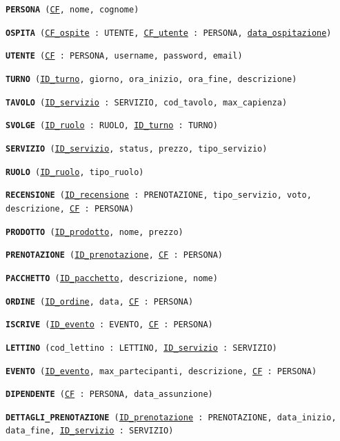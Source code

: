 \documentclass[a4paper,12pt]{report}
\begin{document}
\begin{description}
	\item\texttt{\textbf{PERSONA} (\underline{CF}, nome, cognome)}
	\item\texttt{\textbf{OSPITA} (\underline{CF\_ospite} : UTENTE, \underline{CF\_utente} : PERSONA, \underline{data\_ospitazione})}
	\item\texttt{\textbf{UTENTE} (\underline{CF} : PERSONA, username, password, email)}
	\item\texttt{\textbf{TURNO} (\underline{ID\_turno}, giorno, ora\_inizio, ora\_fine, descrizione)}
	\item\texttt{\textbf{TAVOLO} (\underline{ID\_servizio} : SERVIZIO, cod\_tavolo, max\_capienza)}
	\item\texttt{\textbf{SVOLGE} (\underline{ID\_ruolo} : RUOLO, \underline{ID\_turno} : TURNO)}
	\item\texttt{\textbf{SERVIZIO} (\underline{ID\_servizio}, status, prezzo, tipo\_servizio)}
	\item\texttt{\textbf{RUOLO} (\underline{ID\_ruolo}, tipo\_ruolo)}
	\item\texttt{\textbf{RECENSIONE} (\underline{ID\_recensione} : PRENOTAZIONE, tipo\_servizio, voto, \newline descrizione, \underline{CF} : PERSONA)}
	\item\texttt{\textbf{PRODOTTO} (\underline{ID\_prodotto}, nome, prezzo)}
	\item\texttt{\textbf{PRENOTAZIONE} (\underline{ID\_prenotazione}, \underline{CF} : PERSONA)}
	\item\texttt{\textbf{PACCHETTO} (\underline{ID\_pacchetto}, descrizione, nome)}
	\item\texttt{\textbf{ORDINE} (\underline{ID\_ordine}, data, \underline{CF} : PERSONA)}
	\item\texttt{\textbf{ISCRIVE} (\underline{ID\_evento} : EVENTO, \underline{CF} : PERSONA)}
	\item\texttt{\textbf{LETTINO} (cod\_lettino : LETTINO, \underline{ID\_servizio} : SERVIZIO)}
	\item\texttt{\textbf{EVENTO} (\underline{ID\_evento}, max\_partecipanti, descrizione, \underline{CF} : PERSONA)}
	\item\texttt{\textbf{DIPENDENTE} (\underline{CF} : PERSONA, data\_assunzione)}
	\item\texttt{\textbf{DETTAGLI\_PRENOTAZIONE} (\underline{ID\_prenotazione} : PRENOTAZIONE, data\_inizio, \newline data\_fine, \underline{ID\_servizio} : SERVIZIO)}

\end{description}
\end{document}
